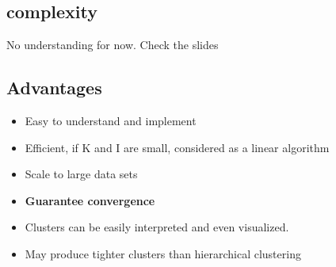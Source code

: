 \documentclass[letterpaper,12pt]{article}
\begin{document}
\subsection{complexity}
No understanding for now. Check the slides

\subsection{Advantages}
\begin{itemize}
    \item Easy to understand and implement
    \item Efficient, if K and I are small, considered as a linear algorithm
    \item Scale to large data sets
    \item \textbf{Guarantee convergence}
    \item Clusters can be easily interpreted and even visualized.
    \item May produce tighter clusters than hierarchical clustering
\end{itemize}
\end{document}
